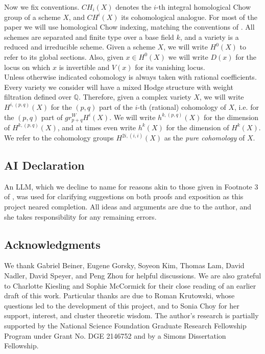 \documentclass[11pt]{amsart}
\theoremstyle{definition}
\theoremstyle{remark}
\numberwithin{equation}{section}
\begin{document}
Now we fix conventions.  $CH_i(X)$ denotes the $i$-th integral homological Chow group of a scheme $X$, and $CH^i(X)$ its cohomological analogue. For most of the paper we will use homological Chow indexing, matching the conventions of \cite{totaro2014chow}. All schemes are separated and finite type over a base field $k$, and a variety is a reduced and irreducible scheme. Given a scheme $X$, we will write $H^0(X)$ to refer to its global sections. Also, given $x \in H^0(X)$ we will write $D(x)$ for the locus on which $x$ is invertible and $V(x)$ for its vanishing locus.\\ %

Unless otherwise indicated cohomology is always taken with rational coefficients. Every variety we consider will have a mixed Hodge structure with weight filtration defined over $\mathbb{Q}$. Therefore, given a complex variety $X$, we will write $H^{i, (p, q)}(X)$ for the $(p, q)$ part of the $i$-th (rational) cohomology of $X$, i.e. for the $(p, q)$ part of $gr_{p+q}^W H^i(X)$. We will write $h^{k,(p, q)}(X)$ for the dimension of $H^{k, (p, q)}(X)$, and at times even write $h^k(X)$ for the dimension of $H^k(X)$. We refer to the cohomology groups $H^{2i, (i, i)}(X)$ as the \textit{pure cohomology} of $X$.

\subsection{AI Declaration}
An LLM, which we decline to name for reasons akin to those given in Footnote 3 of \cite{kelly2026some}, was used for clarifying suggestions on both proofs and exposition as this project neared completion. All ideas and arguments are due to the author, and she takes responsibility for any remaining errors.

\subsection{Acknowledgments} We thank Gabriel Beiner, Eugene Gorsky, Soyeon Kim, Thomas Lam, David Nadler, David Speyer, and Peng Zhou for helpful discussions. We are also grateful to Charlotte Kiesling and Sophie McCormick for their close reading of an earlier draft of this work. Particular thanks are due to Roman Krutowski, whose questions led to the development of this project, and to Sonia Choy for her support, interest, and cluster theoretic wisdom. The author's research is partially supported by the National Science Foundation Graduate Research Fellowship
Program under Grant No. DGE 2146752 and by a Simons Dissertation Fellowship.
\end{document}
